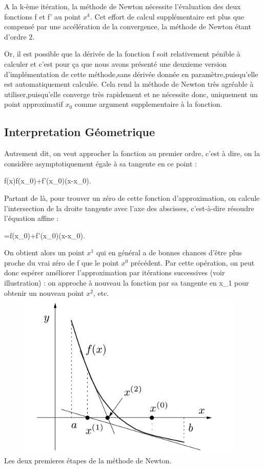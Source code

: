 \documentclass{article}
\begin{document}
A la k-ème itération, la méthode de Newton nécessite l’évaluation des deux fonctions f et f' au point $x^k$. Cet effort de calcul supplémentaire est plus
que compensé par une accélération de la convergence, la méthode de Newton étant d’ordre 2. 

Or, il est possible que la dérivée de la fonction f soit relativement pénible à calculer et c'est pour ça que nous avons présenté une deuxieme version d'implémentation de cette méthode,sans dérivée donnée en paramètre,puisqu'elle est automatiquement calculée.
Cela rend la méthode de Newton très agréable à utiliser,puisqu'elle converge très rapidement et ne nécessite donc, uniquement un point approximatif $x_0$ comme argument supplementaire à la fonction.

\newpage
\subsection{Interpretation Géometrique}
Autrement dit, on veut approcher la fonction au premier ordre, c'est à dire, on la considère asymptotiquement égale à sa tangente en ce point :

{\displaystyle f(x)\simeq f(x_{0})+f'(x_{0})(x-x_{0}).}

Partant de là, pour trouver un zéro de cette fonction d'approximation, on calcule l'intersection de la droite tangente avec l'axe des abscisses, c'est-à-dire résoudre l'équation affine :

{=f(x_{0})+f'(x_{0})(x-x_{0}).}

On obtient alors un point $x^1$ qui en général a de bonnes chances d'être plus proche du vrai zéro de f que le point $x^0$ précédent. Par cette opération, on peut donc espérer améliorer l'approximation par itérations successives (voir illustration) : on approche à nouveau la fonction par sa tangente en {\displaystyle x_{1}} pour obtenir un nouveau point $x^2$, etc.
\\
\includegraphics[width=13cm,height=8cm]{img/interpretation/newton.png}\\
Les deux premieres étapes de la méthode de Newton.
\newpage
\end{document}
